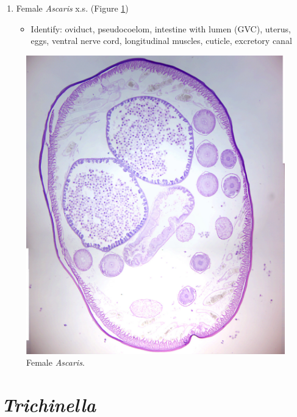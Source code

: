 \begin{enumerate}
\def\labelenumi{\arabic{enumi}.}
\tightlist
\item
  Female \emph{Ascaris} x.s. (Figure \ref{fig:ascaris})

  \begin{itemize}
  \tightlist
  \item
    Identify: oviduct, pseudocoelom, intestine with lumen (GVC), uterus,
    eggs, ventral nerve cord, longitudinal muscles, cuticle, excretory
    canal
  \end{itemize}
\end{enumerate}



\begin{figure}

{\centering \includegraphics[width=0.7\linewidth]{./figures/nematoda/ascaris_female}

}

\caption{Female \emph{Ascaris}.}\label{fig:ascaris}
\end{figure}

\section{\texorpdfstring{\emph{Trichinella}}{Trichinella}}\label{trichinella}

